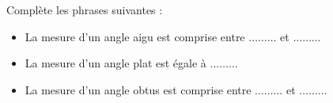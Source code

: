 \begin{pageParcoursu}
\begin{minipage}{0.32\linewidth}
\end{minipage}



Complète les phrases suivantes :
\begin{itemize}
\item La mesure d'un angle aigu est comprise entre $\ldots \ldots \ldots$ et  $\ldots \ldots \ldots$
\item La mesure d'un angle plat est égale à  $\ldots \ldots \ldots$
\item La mesure d'un angle obtus est comprise entre $\ldots \ldots \ldots$ et  $\ldots \ldots \ldots$
\end{itemize}

 
\end{pageParcoursu}


